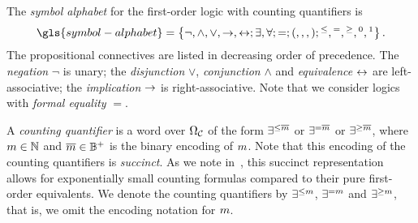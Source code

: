 
The \emph{symbol alphabet} for the first-order logic with counting quantifiers
is
\[
  \gls{symbol-alphabet} = \set{\lnot, \allconns; \allQs;
  =; (,,,); {}^{\leq}, {}^{=}, {}^{\geq}, {}^0, {}^1}.
\]
The propositional connectives are listed in decreasing order of precedence.
The \emph{negation} $\lnot$ is unary;
the \emph{disjunction} $\lor$, \emph{conjunction} $\land$ and \emph{equivalence}
$\leftrightarrow$ are left-associative; the \emph{implication} $\rightarrow$ is
right-associative.
Note that we consider logics with \emph{formal equality} $=$.

A \emph{counting quantifier} is a word over $\Omega_{\mathcal{C}}$ of the form
$\exists^{\leq\overline{m}}$ or $\exists^{=\overline{m}}$ or $\exists^{\geq\overline{m}}$,
where $m \in \mathbb{N}$ and $\overline{m} \in \mathbb{B}^+$ is the binary encoding of
$m$. Note that this encoding of the counting quantifiers is \emph{succinct}.
As we note in~, this succinct representation allows for
exponentially small counting formulas compared to their pure first-order
equivalents.
We denote the counting quantifiers by $\exists^{\leq m}$, $\exists^{=m}$ and
$\exists^{\geq m}$, that is, we omit the encoding notation for $m$.